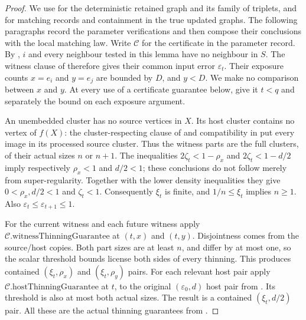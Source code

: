 \begin{proof}
We use  for the deterministic
retained graph and its family of triplets, and
 for matching records and containment
in the true updated graphs. The following paragraphs record the
parameter verifications and then compose their conclusions with the
local matching law.
Write $\mathcal C$ for the certificate in the parameter record. By
, $i$ and every neighbour tested
in this lemma have no neighbour in $S$. The witness clause of
 therefore gives their common input
error $\varepsilon_t$. Their exposure counts $x=e_i$ and $y=e_j$
are bounded by $D$, and $y<D$. We make no comparison between $x$ and
$y$. At every use of a certificate guarantee below, give it $t<q$
and separately the bound on each exposure argument.

An unembedded cluster has no source vertices in $X$. Its host cluster
contains no vertex of $f(X)$: the cluster-respecting clause of
 and compatibility in
 put every image in its processed
source cluster. Thus the witness parts are the full clusters, of their
actual sizes $n$ or $n+1$. The inequalities
$2\zeta_t<1-\rho_x$ and $2\zeta_t<1-d/2$ imply respectively
$\rho_x<1$ and $d/2<1$; these conclusions do not follow merely from
super-regularity. Together with the lower density inequalities they
give $0<\rho_x,d/2<1$ and $\zeta_t<1$.
Consequently $\xi_t$ is finite, and $1/n\le\xi_t$ implies $n\ge1$.
Also $\varepsilon_t\le\varepsilon_{t+1}\le1$.

For the current witness and each future witness apply
$\mathcal C.\mathrm{witnessThinningGuarantee}$ at $(t,x)$ and $(t,y)$.
Disjointness comes from the source/host copies. Both part sizes are at
least $n$, and differ by at most one, so the scalar threshold bounds
license both sides of every thinning. This produces contained
$(\xi_t,\rho_x)$ and $(\xi_t,\rho_y)$ pairs.
For each relevant host pair apply
$\mathcal C.\mathrm{hostThinningGuarantee}$ at $t$, to the original
$(\varepsilon_0,d)$ host pair from .
Its threshold is also at most both actual sizes. The result is a
contained $(\xi_t,d/2)$ pair.
All these are the actual thinning guarantees from
.


\end{proof}
